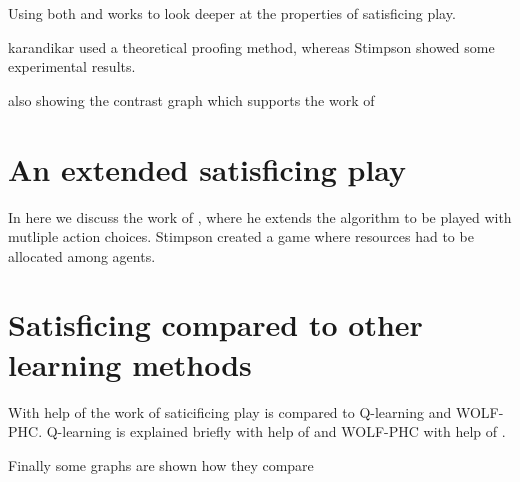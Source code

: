 Using both \citep{karandikar} and \citep{stimpson:2001} works to look deeper
at the properties of satisficing play. 

karandikar used a theoretical proofing method, whereas Stimpson showed some
experimental results.

also showing the contrast graph which supports the work of \citep{arthur}

\section{An extended satisficing play}
\drafting

In here we discuss the work of \citep{stimpson:2003}, where he extends the
algorithm to be played with mutliple action choices.
Stimpson created a game where resources had to be allocated among agents.

\section{Satisficing compared to other learning methods}
\drafting

With help of the work of \citep{crandall} saticificing play is compared
to Q-learning and WOLF-PHC.
Q-learning is explained briefly with help of \citep{sandholm} and WOLF-PHC
with help of \citep{bowling}.
 
Finally some graphs are shown how they compare



\address{Jappie Klooster\\
  Dept. of Informatics\\
  Universiteit Utrecht\\
  The Netherlands\\}
